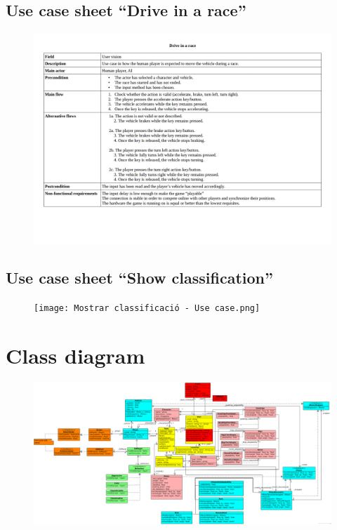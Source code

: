 \documentclass[12pt,a4paper]{article}
\begin{document}
\newpage

\subsection{Use case sheet ``Drive in a race''}

\begin{figure}[ht]
    \centering
    \includegraphics[width=\textwidth]{Fer moure vehicle - Use case.png}
\end{figure}

\subsection{Use case sheet ``Show classification''}

\begin{figure}[ht]
    \centering
    \texttt{[image: Mostrar classificació - Use case.png]}
\end{figure}

\newpage

\section{Class diagram}

\begin{figure}[ht]
    \centering
    \includegraphics[width=\textwidth]{Diagrama de Classes.png}
\end{figure}
\end{document}
